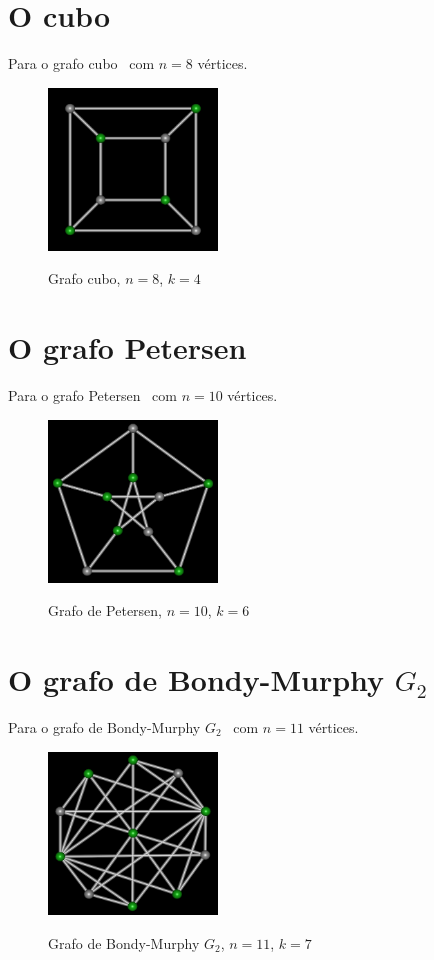 \section{O cubo}
Para o grafo cubo~\cite{cite:example-plato} com $n=8$ vértices.

\begin{figure}[htb]
\centering
\includegraphics[width=0.4\textwidth]{img/cube.png}
\label{fig:example-cube}
\caption{Grafo cubo, $n=8$, $k=4$}
\end{figure}


\section{O grafo Petersen}
Para o grafo Petersen~\cite{cite:example-petersen} com $n=10$
vértices.

\begin{figure}[htb]
\centering
\includegraphics[width=0.4\textwidth]{img/petersen.png}
\label{fig:example-petersen}
\caption{Grafo de Petersen, $n=10$, $k=6$}
\end{figure}


\section{O grafo de Bondy-Murphy $G_2$}
Para o grafo de Bondy-Murphy $G_2$~\cite{cite:example-bondy} com $n=11$
vértices.

\begin{figure}[htb]
\centering
\includegraphics[width=0.4\textwidth]{img/bondymurphyg2.png}
\label{fig:example-bondymurphyg2}
\caption{Grafo de Bondy-Murphy $G_2$, $n=11$, $k=7$}
\end{figure}


